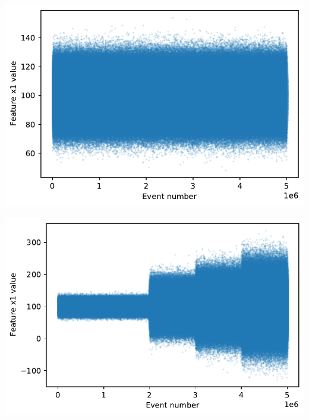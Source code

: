 \begin{center}
\begin{minipage}{.5\textwidth}
  \centering
  \includegraphics[width=1\linewidth]{figures/timeseries-r3.pdf}
  \label{fig:timeseries-r3}
\end{minipage}%
\begin{minipage}{.5\textwidth}
  \centering
  \includegraphics[width=1\linewidth]{figures/timeseries-t3.pdf}
  \label{fig:timeseries-t3}
\end{minipage}
\end{center}

